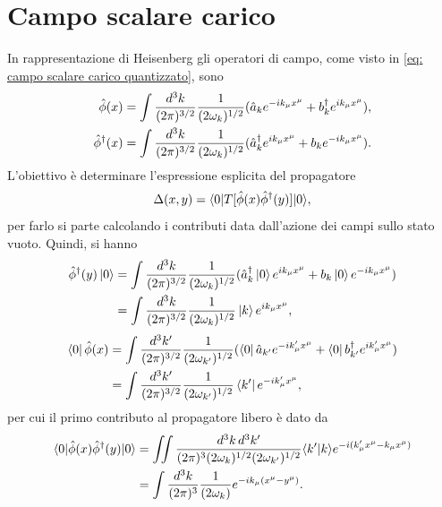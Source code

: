 \section{Campo scalare carico}
In rappresentazione di Heisenberg gli operatori di campo, come visto in \eqref{eq: campo scalare carico quantizzato}, sono 
\begin{align}
    \hat{\phi}(x) &= \int\frac{d^3k}{(2\pi)^{3/2}}\frac{1}{(2\omega_k)^{1/2}}(\hat{a}_k e^{-ik_\mu x^\mu} + b^\dagger_k e^{ik_\mu x^\mu}), \\
    \hat{\phi}^\dagger(x) &= \int\frac{d^3k}{(2\pi)^{3/2}}\frac{1}{(2\omega_k)^{1/2}}(\hat{a}^\dagger_k e^{ik_\mu x^\mu} + b_k e^{-ik_\mu x^\mu}).
\end{align}
L'obiettivo è determinare l'espressione esplicita del propagatore 
\begin{equation}
    \Delta(x,y) = \langle 0 | T[\hat{\phi}(x)\hat{\phi}^\dagger(y)] | 0 \rangle,
\end{equation}
per farlo si parte calcolando i contributi data dall'azione dei campi sullo stato vuoto. Quindi, si hanno
\begin{equation}
    \begin{split}
        \hat{\phi}^\dagger(y)\ket{0} &= \int\frac{d^3k}{(2\pi)^{3/2}}\frac{1}{(2\omega_k)^{1/2}}(\hat{a}^\dagger_k\ket{0} e^{ik_\mu x^\mu} + b_k\ket{0} e^{-ik_\mu x^\mu}) \\
        &= \int\frac{d^3k}{(2\pi)^{3/2}}\frac{1}{(2\omega_k)^{1/2}}\ket{k} e^{ik_\mu x^\mu},
    \end{split}
\end{equation}
\begin{equation}
    \begin{split}
        \bra{0}\hat{\phi}(x) &= \int\frac{d^3k'}{(2\pi)^{3/2}}\frac{1}{(2\omega_{k'})^{1/2}}(\bra{0}\hat{a}_{k'} e^{-ik'_\mu x^\mu} + \bra{0}b^\dagger_{k'} e^{ik'_\mu x^\mu}) \\
        &= \int\frac{d^3k'}{(2\pi)^{3/2}}\frac{1}{(2\omega_{k'})^{1/2}}\bra{k'} e^{-ik'_\mu x^\mu},
    \end{split}
\end{equation}
per cui il primo contributo al propagatore libero è dato da
\begin{equation}
    \begin{split}
        \langle 0 | \hat{\phi}(x)\hat{\phi}^\dagger(y) | 0 \rangle &= \iint\frac{d^3k\,d^3k'}{(2\pi)^3(2\omega_k)^{1/2}(2\omega_{k'})^{1/2}}\langle k' | k \rangle e^{-i(k'_\mu x^\mu - k_\mu x^\mu)} \\
        &= \int\frac{d^3k}{(2\pi)^3}\frac{1}{(2\omega_k)}e^{-ik_\mu(x^\mu - y^\mu)}.
    \end{split}
\end{equation}

